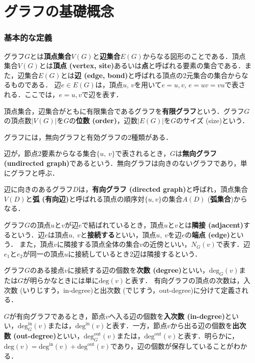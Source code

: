 \part{グラフの基礎概念}

\section{基本的な定義}
\begin{definition}[グラフ]
グラフ$G$とは\textbf{頂点集合}$V(G)$と\textbf{辺集合}$E(G)$からなる図形のことである．頂点集合$V(G)$とは\textbf{頂点 (vertex, site)}あるいは\textbf{点}と呼ばれる要素の集合である．また，辺集合$E(G)$とは\textbf{辺 (edge, bond)}と呼ばれる頂点の2元集合の集合からなるものである．
辺$e\in E(G)$は，頂点$u$, $v$を用いて$e={u, v}$, $e=uv=vu$で表される．ここでは，$e={u, v}$で辺を表す．

頂点集合，辺集合がともに有限集合であるグラフを\textbf{有限グラフ}という．グラフ$G$の頂点数$|V(G)|$を$G$の\textbf{位数 (order)}，辺数$|E(G)|$を$G$のサイズ (size)という．
\end{definition}
グラフには，無向グラフと有効グラフの2種類がある．
\begin{definition}[無向グラフ]
    辺が，節点2要素からなる集合$\{u,\ v\}$で表されるとき，$G$は\textbf{無向グラフ (undirected graph)}であるという．無向グラフは向きのないグラフであり，単にグラフと呼ぶ．
\end{definition}

\begin{definition}[有向グラフ]
    辺に向きのあるグラフ$D$は，\textbf{有向グラフ (directed graph)}と呼ばれ，頂点集合$V(D)$と\textbf{弧 (有向辺)}と呼ばれる頂点の順序対$\{u,v\}$の集合$A(D)$ (\textbf{弧集合})からなる．
\end{definition}

\begin{definition}[端点，隣接，接続]
グラフ$G$の頂点$u$と$v$が辺$e$で結ばれているとき，頂点$u$と$v$とは\textbf{隣接 (adjacent)}するという．辺$e$は頂点$u,\ v$と\textbf{接続する}といい，頂点$u,\ v$を辺$e$の\textbf{端点 (edge)}という．
また，頂点$v$に隣接する頂点全体の集合$v$の近傍といい，$N_G(v)$で表す．辺$e_1$と$e_2$が同一の頂点$u$に接続しているとき2辺は隣接するという．
\end{definition}

グラフ$G$のある接点$v$に接続する辺の個数を\textbf{次数 (degree)}といい，$\text{deg}_G(v)$または$G$が明らかなときには単に$\text{deg}(v)$と表す．
有向グラフの頂点の次数は，入次数 (いりじすう，in-degree)と出次数 (でじすう，out-degree)に分けて定義される．
\begin{definition}
    $G$が有向グラフであるとき，節点$v$へ入る辺の個数を\textbf{入次数 (in-degree)}といい，$\text{deg}_G^{\text{in}}(v)$または，$\text{deg}^{\text{in}}(v)$と表す．一方，節点$v$から出る辺の個数を\textbf{出次数 (out-degree)}といい，$\text{deg}_G^{\text{out}}(v)$または，$\text{deg}^{\text{out}}(v)$と表す．明らかに，$\text{deg}(v)=\text{deg}^{\text{in}}(v)+\text{deg}^{\text{out}}(v)$であり，辺の個数が保存していることがわかる．
\end{definition}



